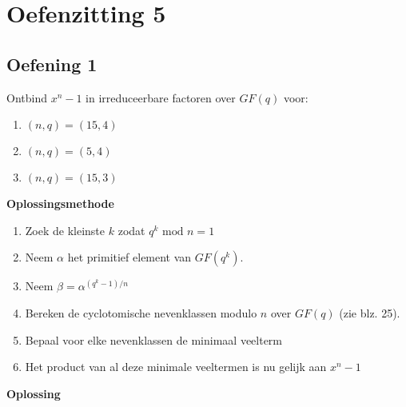 \documentclass[11pt,a4paper,titlepage]{article}
\begin{document}
\section{Oefenzitting 5}
\subsection{Oefening 1}
Ontbind $x^n - 1$ in irreduceerbare factoren over $GF(q)$ voor:
\begin{enumerate}[label=(\alph*)]
	\item $ (n, q) = (15, 4)$
	\item $(n, q) = (5, 4)$
	\item $(n, q) = (15, 3)$
\end{enumerate}
\textbf{Oplossingsmethode}
\begin{enumerate}
	\item Zoek de kleinste $k$ zodat $q^k \text{ mod } n = 1$
	\item Neem $\alpha$ het primitief element van $GF(q^k)$.
	\item Neem $\beta = \alpha ^{(q^k-1)/n}$
	 \item Bereken de cyclotomische nevenklassen modulo $n$ over $GF(q)$ (zie blz. 25).
	\item Bepaal voor elke nevenklassen de minimaal veelterm
	\item Het product van al deze minimale veeltermen is nu gelijk aan $x^n - 1$
\end{enumerate}
\textbf{Oplossing}
\end{document}
